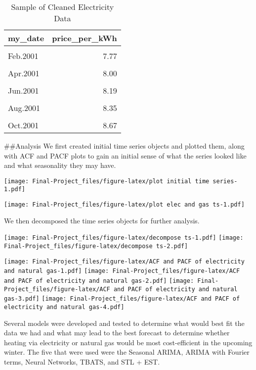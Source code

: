 \documentclass[
]{article}
\begin{document}
\begin{wraptable}{l}{0pt}

\caption{\label{tab:unnamed-chunk-2}Sample of Cleaned Electricity Data}
\centering
\begin{tabular}[t]{l|r}
\hline
my\_date & price\_per\_kWh\\
\hline
\cellcolor{gray!6}{Jan.2001} & \cellcolor{gray!6}{7.53}\\
\hline
Feb.2001 & 7.77\\
\hline
\cellcolor{gray!6}{Mar.2001} & \cellcolor{gray!6}{8.02}\\
\hline
Apr.2001 & 8.00\\
\hline
\cellcolor{gray!6}{May.2001} & \cellcolor{gray!6}{8.22}\\
\hline
Jun.2001 & 8.19\\
\hline
\cellcolor{gray!6}{Jul.2001} & \cellcolor{gray!6}{8.31}\\
\hline
Aug.2001 & 8.35\\
\hline
\cellcolor{gray!6}{Sep.2001} & \cellcolor{gray!6}{8.35}\\
\hline
Oct.2001 & 8.67\\
\hline
\end{tabular}
\end{wraptable}

\#\#Analysis We first created initial time series objects and plotted
them, along with ACF and PACF plots to gain an initial sense of what the
series looked like and what seasonality they may have.

\texttt{[image: Final-Project\_files/figure-latex/plot initial time series-1.pdf]}

\texttt{[image: Final-Project\_files/figure-latex/plot elec and gas ts-1.pdf]}

We then decomposed the time series objects for further analysis.

\texttt{[image: Final-Project\_files/figure-latex/decompose ts-1.pdf]}
\texttt{[image: Final-Project\_files/figure-latex/decompose ts-2.pdf]}

\texttt{[image: Final-Project\_files/figure-latex/ACF and PACF of electricity and natural gas-1.pdf]}
\texttt{[image: Final-Project\_files/figure-latex/ACF and PACF of electricity and natural gas-2.pdf]}
\texttt{[image: Final-Project\_files/figure-latex/ACF and PACF of electricity and natural gas-3.pdf]}
\texttt{[image: Final-Project\_files/figure-latex/ACF and PACF of electricity and natural gas-4.pdf]}

Several models were developed and tested to determine what would best
fit the data we had and what may lead to the best forecast to determine
whether heating via electricity or natural gas would be most
cost-efficient in the upcoming winter. The five that were used were the
Seasonal ARIMA, ARIMA with Fourier terms, Neural Networks, TBATS, and
STL + EST.
\end{document}
